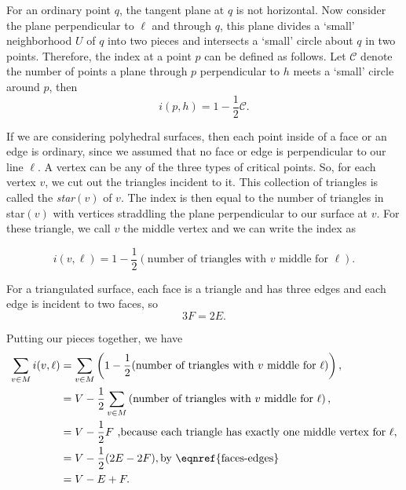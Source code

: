 For an ordinary point $q$, the tangent plane at $q$ is not horizontal. 
Now consider the plane perpendicular to $\ell$ and through $q$, this plane
divides a `small' neighborhood $U$ of $q$ into two pieces and intersects
a `small' circle about $q$ in two points.
Therefore, the index at a point $p$ can be defined as follows.
Let $\mathcal{C}$ denote the number of points a plane through $p$ perpendicular
to $h$ meets a `small' circle around $p$, then 
$$i(p,h)=1-\frac{1}{2}\mathcal{C}.$$

If we are considering polyhedral surfaces, then each point inside of a face or an edge
is ordinary, since we assumed that no face or edge is perpendicular to our line $\ell.$
A vertex can be any of the three types of critical points.
So, for each vertex $v$, we cut out the triangles incident to it. This collection of triangles
is called the \emph{star}$(v)$ of $v$. 
The index is then equal to the number of triangles in star$(v)$ with vertices
straddling the plane perpendicular to our surface at $v$. For these triangle,
we call $v$ the middle vertex and we can write the index as

$$i(v,\ell)=1-\frac{1}{2} \left(\text{number of triangles with } v \text{ middle for } \ell\right).$$



For a triangulated surface, each face is a triangle and has three edges and each
edge is incident to two faces, so
\begin{equation} \label{eqn:faces-edges}
	3F=2E.
\end{equation}

Putting our pieces together, we have
\begin{align}
\sum_{v\in M}i(v,\ell) &=\sum_{v\in M} \left(1-\frac{1}{2}(\text{number of triangles with } v \text{ middle for } \ell)\right),  \\ \nonumber
       &=V - \frac{1}{2}\sum_{v\in M} \left(\text{number of triangles with } v \text{ middle for } \ell\right), \\ \nonumber
       &=V-\frac{1}{2} F \text{ ,because each triangle has exactly one middle vertex for  } \ell,\\ \nonumber
       &= V-\frac{1}{2}(2E-2F), \text{by \eqnref{faces-edges}}\\ \nonumber
       &=V-E+F. \nonumber 
\end{align}



